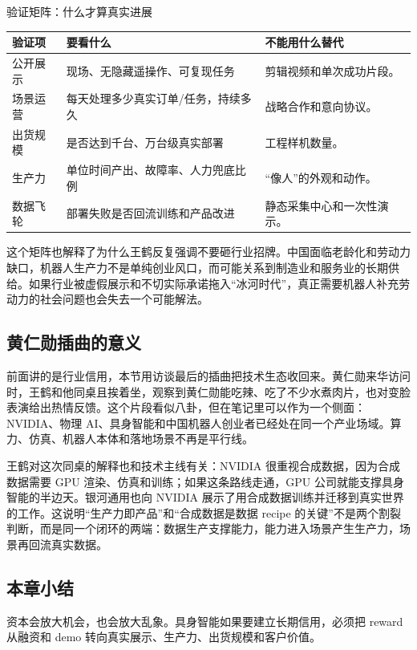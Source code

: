 \begin{knowledgebox}{验证矩阵：什么才算真实进展}
\begin{tabularx}{\textwidth}{p{}p{}X}
\toprule
验证项 & 要看什么 & 不能用什么替代 \\
\midrule
公开展示 & 现场、无隐藏遥操作、可复现任务 & 剪辑视频和单次成功片段。 \\
场景运营 & 每天处理多少真实订单/任务，持续多久 & 战略合作和意向协议。 \\
出货规模 & 是否达到千台、万台级真实部署 & 工程样机数量。 \\
生产力 & 单位时间产出、故障率、人力兜底比例 & “像人”的外观和动作。 \\
数据飞轮 & 部署失败是否回流训练和产品改进 & 静态采集中心和一次性演示。 \\
\bottomrule
\end{tabularx}
\end{knowledgebox}

这个矩阵也解释了为什么王鹤反复强调不要砸行业招牌。中国面临老龄化和劳动力缺口，机器人生产力不是单纯创业风口，而可能关系到制造业和服务业的长期供给。如果行业被虚假展示和不切实际承诺拖入“冰河时代”，真正需要机器人补充劳动力的社会问题也会失去一个可能解法。

\subsection{黄仁勋插曲的意义}

前面讲的是行业信用，本节用访谈最后的插曲把技术生态收回来。黄仁勋来华访问时，王鹤和他同桌且挨着坐，观察到黄仁勋能吃辣、吃了不少水煮肉片，也对变脸表演给出热情反馈。这个片段看似八卦，但在笔记里可以作为一个侧面：NVIDIA、物理 AI、具身智能和中国机器人创业者已经处在同一个产业场域。算力、仿真、机器人本体和落地场景不再是平行线。

王鹤对这次同桌的解释也和技术主线有关：NVIDIA 很重视合成数据，因为合成数据需要 GPU 渲染、仿真和训练；如果这条路线走通，GPU 公司就能支撑具身智能的半边天。银河通用也向 NVIDIA 展示了用合成数据训练并迁移到真实世界的工作。这说明“生产力即产品”和“合成数据是数据 recipe 的关键”不是两个割裂判断，而是同一个闭环的两端：数据生产支撑能力，能力进入场景产生生产力，场景再回流真实数据。

\subsection{本章小结}

资本会放大机会，也会放大乱象。具身智能如果要建立长期信用，必须把 reward 从融资和 demo 转向真实展示、生产力、出货规模和客户价值。

